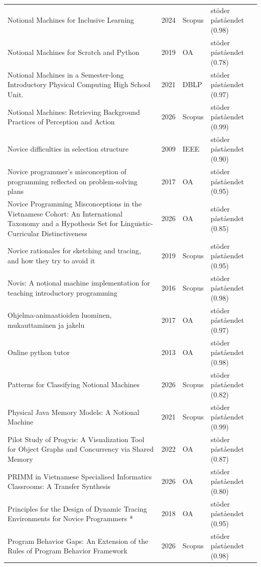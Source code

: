 \begin{longtable}{@{}%
  >{\raggedright\arraybackslash}p{}c%
  >{\raggedright\arraybackslash}p{}%
  >{\raggedright\arraybackslash}p{}@{}}
Notional Machines for Inclusive Learning & 2024 & Scopus & stöder påståendet (0.98) \\
Notional Machines for Scratch and Python & 2019 & OA & stöder påståendet (0.78) \\
Notional Machines in a Semester-long Introductory Physical Computing High School Unit. & 2021 & DBLP & stöder påståendet (0.97) \\
Notional Machines: Retrieving Background Practices of Perception and Action & 2026 & Scopus & stöder påståendet (0.99) \\
Novice difficulties in selection structure & 2009 & IEEE & stöder påståendet (0.90) \\
Novice programmer's misconception of programming reflected on problem-solving plans & 2017 & OA & stöder påståendet (0.95) \\
Novice Programming Misconceptions in the Vietnamese Cohort: An International Taxonomy and a Hypothesis Set for Linguistic-Curricular Distinctiveness & 2026 & OA & stöder påståendet (0.85) \\
Novice rationales for sketching and tracing, and how they try to avoid it & 2019 & Scopus & stöder påståendet (0.95) \\
Novis: A notional machine implementation for teaching introductory programming & 2016 & Scopus & stöder påståendet (0.98) \\
Ohjelma-animaatioiden luominen, mukauttaminen ja jakelu & 2017 & OA & stöder påståendet (0.97) \\
Online python tutor & 2013 & OA & stöder påståendet (0.98) \\
Patterns for Classifying Notional Machines & 2026 & Scopus & stöder påståendet (0.82) \\
Physical Java Memory Models: A Notional Machine & 2021 & Scopus & stöder påståendet (0.99) \\
Pilot Study of Progvis: A Visualization Tool for Object Graphs and Concurrency via Shared Memory & 2022 & OA & stöder påståendet (0.87) \\
PRIMM in Vietnamese Specialised Informatics Classrooms: A Transfer Synthesis & 2026 & OA & stöder påståendet (0.80) \\
Principles for the Design of Dynamic Tracing Environments for Novice Programmers * & 2018 & OA & stöder påståendet (0.95) \\
Program Behavior Gaps: An Extension of the Rules of Program Behavior Framework & 2026 & Scopus & stöder påståendet (0.98) \\

\end{longtable}
